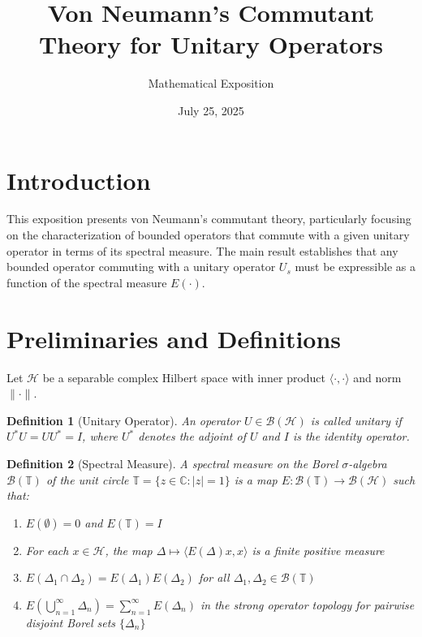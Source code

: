 \documentclass{article}
\newcommand{\cdummy}{\cdot}
\newtheorem{definition}{Definition}
\begin{document}
\title{Von Neumann's Commutant Theory for Unitary Operators}

\author{Mathematical Exposition}

\date{July 25, 2025}

\maketitle

{\tableofcontents}

\section{Introduction}

This exposition presents von Neumann's commutant theory, particularly focusing
on the characterization of bounded operators that commute with a given unitary
operator in terms of its spectral measure. The main result establishes that
any bounded operator commuting with a unitary operator $U_s$ must be
expressible as a function of the spectral measure $E (\cdummy)$.

\section{Preliminaries and Definitions}

Let $\mathcal{H}$ be a separable complex Hilbert space with inner product
$\langle \cdummy, \cdummy \rangle$ and norm $\| \cdummy \|$.

\begin{definition}
  [Unitary Operator] An operator $U \in \mathcal{B} (\mathcal{H})$ is called
  unitary if $U^{\ast} U = UU^{\ast} = I$, where $U^{\ast}$ denotes the
  adjoint of $U$ and $I$ is the identity operator.
\end{definition}

\begin{definition}
  [Spectral Measure] A spectral measure on the Borel $\sigma$-algebra
  $\mathcal{B} (\mathbb{T})$ of the unit circle $\mathbb{T}= \{z \in
  \mathbb{C}: |z| = 1\}$ is a map $E : \mathcal{B} (\mathbb{T}) \to
  \mathcal{B} (\mathcal{H})$ such that:
  \begin{enumerate}
    \item $E (\emptyset) = 0$ and $E (\mathbb{T}) = I$
    
    \item For each $x \in \mathcal{H}$, the map $\Delta \mapsto \langle E
    (\Delta) x, x \rangle$ is a finite positive measure
    
    \item $E (\Delta_1 \cap \Delta_2) = E (\Delta_1) E (\Delta_2)$ for all
    $\Delta_1, \Delta_2 \in \mathcal{B} (\mathbb{T})$
    
    \item $E (\bigcup_{n = 1}^{\infty} \Delta_n) = \sum_{n = 1}^{\infty} E
    (\Delta_n)$ in the strong operator topology for pairwise disjoint Borel
    sets $\{\Delta_n \}$
  \end{enumerate}
\end{definition}
\end{document}
